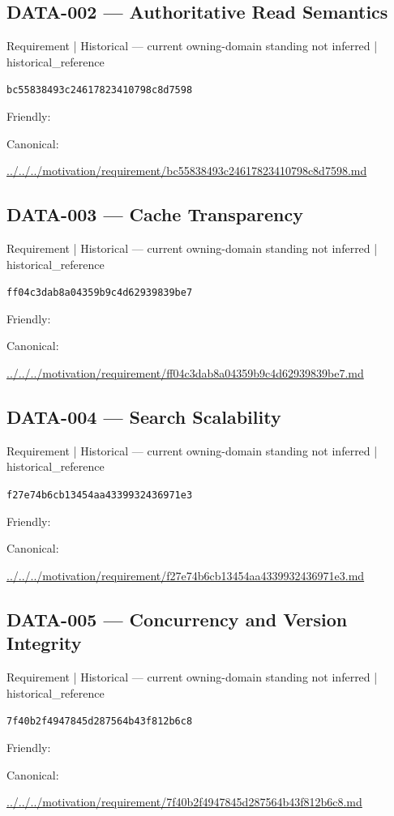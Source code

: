 \documentclass[10pt,a4paper]{article}
\begin{document}
\subsection*{DATA-002 — Authoritative Read Semantics}
{\small Requirement | Historical — current owning-domain standing not inferred | historical\_reference}\par
\texttt{bc55838493c24617823410798c8d7598}\par
Friendly: \par
Canonical: \par
{\footnotesize\url{../../../motivation/requirement/bc55838493c24617823410798c8d7598.md}}\par
\subsection*{DATA-003 — Cache Transparency}
{\small Requirement | Historical — current owning-domain standing not inferred | historical\_reference}\par
\texttt{ff04c3dab8a04359b9c4d62939839be7}\par
Friendly: \par
Canonical: \par
{\footnotesize\url{../../../motivation/requirement/ff04c3dab8a04359b9c4d62939839be7.md}}\par
\subsection*{DATA-004 — Search Scalability}
{\small Requirement | Historical — current owning-domain standing not inferred | historical\_reference}\par
\texttt{f27e74b6cb13454aa4339932436971e3}\par
Friendly: \par
Canonical: \par
{\footnotesize\url{../../../motivation/requirement/f27e74b6cb13454aa4339932436971e3.md}}\par
\subsection*{DATA-005 — Concurrency and Version Integrity}
{\small Requirement | Historical — current owning-domain standing not inferred | historical\_reference}\par
\texttt{7f40b2f4947845d287564b43f812b6c8}\par
Friendly: \par
Canonical: \par
{\footnotesize\url{../../../motivation/requirement/7f40b2f4947845d287564b43f812b6c8.md}}\par
\end{document}
